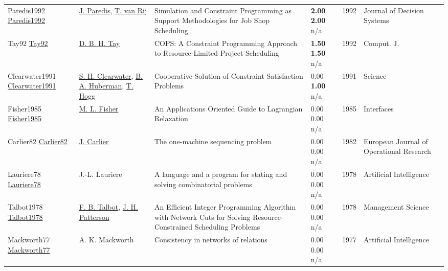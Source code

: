 {\begin{longtable}{p{3cm}p{5cm}p{10cm}p{1cm}rp{2.5cm}l}
Paredis1992 \href{http://dx.doi.org/10.1080/12460125.1992.10511509}{Paredis1992} & \hyperref[auth:a1998]{J. Paredis}, \hyperref[auth:a1999]{T. van Rij} & Simulation and Constraint Programming as Support Methodologies for Job Shop Scheduling & \noindent{}\textbf{2.00} \textbf{2.00} n/a & 1992 & Journal of Decision Systems & \cite{Paredis1992}\\
Tay92 \href{}{Tay92} & \hyperref[auth:a701]{D. B. H. Tay} & {COPS:} {A} Constraint Programming Approach to Resource-Limited Project Scheduling & \noindent{}\textbf{1.50} \textbf{1.50} n/a & 1992 & Comput. J. & \cite{Tay92}\\
Clearwater1991 \href{http://dx.doi.org/10.1126/science.254.5035.1181}{Clearwater1991} & \hyperref[auth:a1776]{S. H. Clearwater}, \hyperref[auth:a1777]{B. A. Huberman}, \hyperref[auth:a1778]{T. Hogg} & Cooperative Solution of Constraint Satisfaction Problems & \noindent{}\textcolor{black!50}{0.00} \textbf{1.00} n/a & 1991 & Science & \cite{Clearwater1991}\\
Fisher1985 \href{http://dx.doi.org/10.1287/inte.15.2.10}{Fisher1985} & \hyperref[auth:a1772]{M. L. Fisher} & An Applications Oriented Guide to Lagrangian Relaxation & \noindent{}\textcolor{black!50}{0.00} \textcolor{black!50}{0.00} n/a & 1985 & \cellcolor{red!20}Interfaces & \cite{Fisher1985}\\
Carlier82 \href{http://dx.doi.org/10.1016/s0377-2217(82)80007-6}{Carlier82} & \hyperref[auth:a845]{J. Carlier} & The one-machine sequencing problem & \noindent{}\textcolor{black!50}{0.00} \textcolor{black!50}{0.00} n/a & 1982 & European Journal of Operational Research & \cite{Carlier82}\\
Lauriere78 \href{http://dx.doi.org/10.1016/0004-3702(78)90029-2}{Lauriere78} & J.-L. Lauriere & A language and a program for stating and solving combinatorial problems & \noindent{}\textcolor{black!50}{0.00} \textcolor{black!50}{0.00} n/a & 1978 & Artificial Intelligence & \cite{Lauriere78}\\
Talbot1978 \href{http://dx.doi.org/10.1287/mnsc.24.11.1163}{Talbot1978} & \hyperref[auth:a1497]{F. B. Talbot}, \hyperref[auth:a1498]{J. H. Patterson} & An Efficient Integer Programming Algorithm with Network Cuts for Solving Resource-Constrained Scheduling Problems & \noindent{}\textcolor{black!50}{0.00} \textcolor{black!50}{0.00} n/a & 1978 & Management Science & \cite{Talbot1978}\\
Mackworth77 \href{http://dx.doi.org/10.1016/0004-3702(77)90007-8}{Mackworth77} & A. K. Mackworth & Consistency in networks of relations & \noindent{}\textcolor{black!50}{0.00} \textcolor{black!50}{0.00} n/a & 1977 & Artificial Intelligence & \cite{Mackworth77}\\

\end{longtable}}
